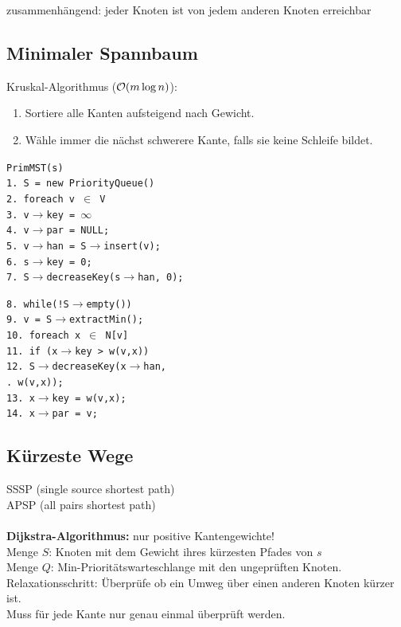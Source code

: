 \documentclass[fs, footer]{latex4ei}
\renewcommand{\t}{\texttt}
\begin{document}
\begin{multicols*}{4}
{{zusammenhängend: jeder Knoten ist von jedem anderen Knoten erreichbar\\

	\subsection{Minimaler Spannbaum}
	Kruskal-Algorithmus ($\operatorname{\mathcal O}(m\log n)$):
	\begin{enumerate}\itemsep-2pt
		\item Sortiere alle Kanten aufsteigend nach Gewicht.
		\item Wähle immer die nächst schwerere Kante, falls sie keine Schleife bildet.
	\end{enumerate}
	
	\parbox{3.6cm}{
	\t{PrimMST(s) \\
	1.	S = new PriorityQueue()\\
	2.	foreach v $\in$ V\\
	3.	\quad v$\rightarrow$key = $\infty$\\
	4.	\quad v$\rightarrow$par = NULL;\\
	5.	\quad v$\rightarrow$han = S$\rightarrow$insert(v);\\
	6.	s$\rightarrow$key = 0;\\
	7.	S$\rightarrow$decreaseKey(s$\rightarrow$han, 0);\\
	}}\hspace{-.2cm}
	\parbox{3.5cm}{
	\t{8.	while(!S$\rightarrow$empty())\\
	9.	\quad v = S$\rightarrow$extractMin();\\
	10.	\quad foreach x $\in$ N[v]\\
	11.	\quad \quad if (x$\rightarrow$key > w(v,x))\\
	12.	\quad \quad \quad S$\rightarrow$decreaseKey(x$\rightarrow$han, \\
	. \quad \quad \quad \quad \quad w(v,x));\\
	13.	\quad \quad \quad x$\rightarrow$key = w(v,x);\\
	14.	\quad \quad \quad x$\rightarrow$par = v;\\
	}}
	
	\subsection{Kürzeste Wege}
	SSSP (single source shortest path)\\
	APSP (all pairs shortest path)\\
	\\
	\textbf{Dijkstra-Algorithmus:} nur positive Kantengewichte!\\
	Menge $S$: Knoten mit dem Gewicht ihres kürzesten Pfades von $s$\\
	Menge $Q$: Min-Prioritätswarteschlange mit den ungeprüften Knoten.\\ 
	Relaxationsschritt: Überprüfe ob ein Umweg über einen anderen Knoten kürzer ist.\\
	Muss für jede Kante nur genau einmal überprüft werden.

}}
\end{multicols*}
\end{document}
